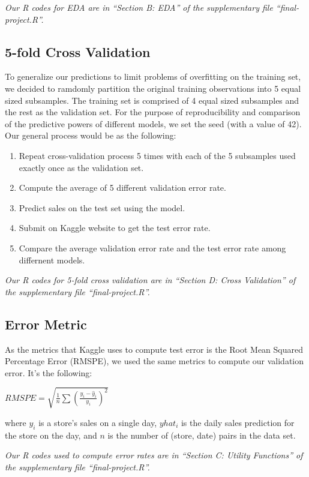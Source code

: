 \documentclass[letterpaper,twocolumn,11pt]{article}
\begin{document}
\begin{enumerate}
\end{enumerate}

\textit{Our R codes for EDA are in ``Section B: EDA'' of the supplementary file ``final-project.R''.}

\subsection{5-fold Cross Validation}
To generalize our predictions to limit problems of overfitting on the training set, we decided to ramdomly partition the original training observations into 5 equal sized subsamples. The training set is comprised of 4 equal sized subsamples and the rest as the validation set. For the purpose of reproducibility and comparison of the predictive powers of different models, we set the seed (with a value of 42). Our general process would be as the following:
\begin{enumerate}
\item  Repeat cross-validation process 5 times with each of the 5 subsamples used exactly once as the validation set.
\item Compute the average of 5 different validation error rate. 
\item Predict sales on the test set using the model. 
\item Submit on Kaggle website to get the test error rate.
\item Compare the average validation error rate and the test error rate among differnent models.
\end{enumerate}
  
\textit{Our R codes for 5-fold cross validation are in ``Section D: Cross Validation'' of the supplementary file ``final-project.R''.}

\subsection{Error Metric}
As the metrics that Kaggle uses to compute test error is the Root Mean Squared Percentage Error (RMSPE), we used the same metrics to compute our validation error. It's the following:

$RMSPE = \sqrt{\frac{1}{n} \sum {(\frac{y_i - \hat y_i}{y_i})}^2}$

where ${y_i}$ is a store's sales on a single day, ${yhat_i}$ is the daily sales prediction for the store on the day, and ${n}$ is the number of (store, date) pairs in the data set.

\textit{Our R codes used to compute error rates are in ``Section C: Utility Functions'' of the supplementary file ``final-project.R''.}
\end{document}
